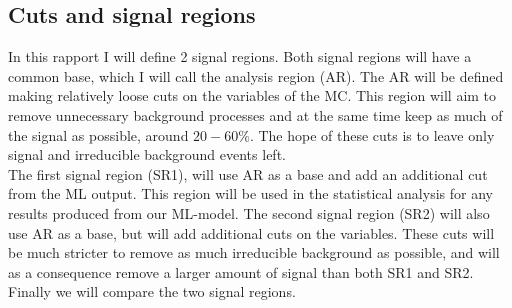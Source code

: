 \documentclass{article}
\begin{document}
\subsection{Cuts and signal regions}
In this rapport I will define 2 signal regions. Both signal regions will have a common base, which I will call the analysis region (AR). The AR will be defined making relatively loose cuts on the variables of the MC. This region will aim to remove unnecessary background processes and at the same time keep as much of the signal as possible, around $20-60\%$. The hope of these cuts is to leave only signal and irreducible background events left.
\\
The first signal region (SR1), will use AR as a base and add an additional cut from the ML output.  This region will be used in the statistical analysis for any results produced from our ML-model. The second signal region (SR2) will also use AR as a base, but will add additional cuts on the variables. These cuts will be much stricter to remove as much irreducible background as possible, and will as a consequence remove a larger amount of signal than both SR1 and SR2.  Finally we will compare the two signal regions.
\end{document}
